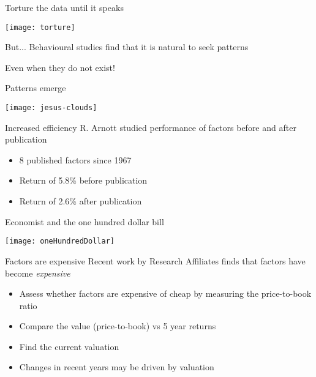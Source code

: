 \documentclass[14pt,xcolor=pdftex,dvipsnames,table]{beamer}\usepackage[]{graphicx}\usepackage[]{color}
\begin{document}
\begin{frame}{Torture the data until it speaks}
\begin{center}
\texttt{[image: torture]}
\end{center}
\end{frame}

\begin{frame}{But...}
Behavioural studies find that it is natural to seek patterns
\pause
\vspace{1cm}
\begin{block}{}
Even when they do not exist!
\end{block}
\end{frame}

\begin{frame}{Patterns emerge}
\begin{center}
\texttt{[image: jesus-clouds]}
\end{center}
\end{frame}


\begin{frame}{Increased efficiency}
R. Arnott studied performance of factors before and after publication
\begin{itemize}[<+-| alert@+>]
\pause
\item 8 published factors since 1967
\item Return of 5.8\% before publication
\item Return of 2.6\% after publication
\end{itemize}
\end{frame}

\begin{frame}{Economist and the one hundred dollar bill}
\begin{center}
\texttt{[image: oneHundredDollar]}
\end{center}
\end{frame}

\begin{frame}{Factors are expensive}
Recent work by Research Affiliates finds that factors have become \emph{expensive}
\begin{itemize}[<+-| alert@+>]
\pause
\item Assess whether factors are expensive of cheap by measuring the price-to-book ratio
\item Compare the value (price-to-book) vs 5 year returns
\item Find the current valuation
\item Changes in recent years  may be driven by valuation
\end{itemize}
\end{frame}
\end{document}
